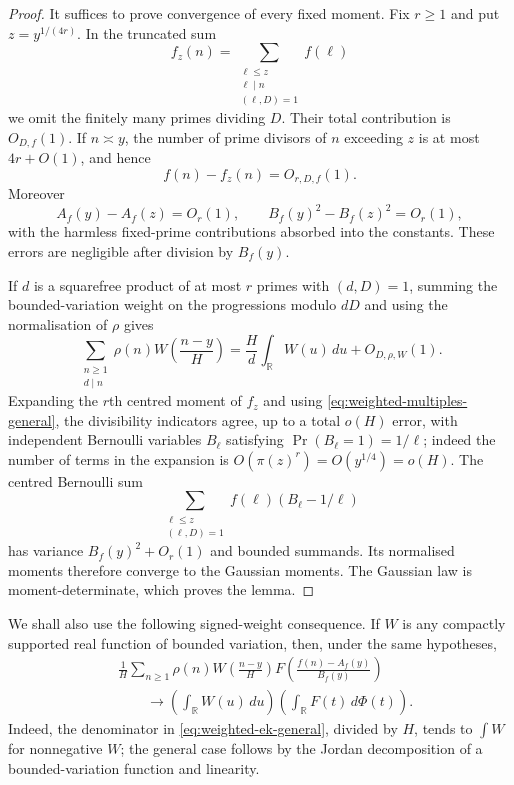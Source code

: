 \documentclass[11pt,reqno]{amsart}
\theoremstyle{plain}
\theoremstyle{definition}
\newcommand{\R}{\mathbb{R}}
\newcommand{\1}{\mathbf 1}
\begin{document}
\begin{proof}
It suffices to prove convergence of every fixed moment.  Fix $r\ge1$ and put $z=y^{1/(4r)}$.  In the truncated sum
\[
 f_z(n)=\sum_{\substack{\ell\le z\\\ell\mid n\\(\ell,D)=1}}f(\ell)
\]
we omit the finitely many primes dividing $D$.  Their total contribution is $O_{D,f}(1)$.  If $n\asymp y$, the number of prime divisors of $n$ exceeding $z$ is at most $4r+O(1)$, and hence
\[
 f(n)-f_z(n)=O_{r,D,f}(1).
\]
Moreover
\[
 A_f(y)-A_f(z)=O_r(1),\qquad B_f(y)^2-B_f(z)^2=O_r(1),
\]
with the harmless fixed-prime contributions absorbed into the constants.  These errors are negligible after division by $B_f(y)$.

If $d$ is a squarefree product of at most $r$ primes with $(d,D)=1$, summing the bounded-variation weight on the progressions modulo $dD$ and using the normalisation of $\rho$ gives
\begin{equation}\label{eq:weighted-multiples-general}
 \sum_{\substack{n\ge1\\d\mid n}}
 \rho(n)W\!\left(\frac{n-y}{H}\right)
 =\frac Hd\int_{\R}W(u)\,du+O_{D,\rho,W}(1).
\end{equation}
Expanding the $r$th centred moment of $f_z$ and using \eqref{eq:weighted-multiples-general}, the divisibility indicators agree, up to a total $o(H)$ error, with independent Bernoulli variables $B_\ell$ satisfying $\Pr(B_\ell=1)=1/\ell$; indeed the number of terms in the expansion is $O(\pi(z)^r)=O(y^{1/4})=o(H)$.  The centred Bernoulli sum
\[
 \sum_{\substack{\ell\le z\\(\ell,D)=1}}f(\ell)(B_\ell-1/\ell)
\]
has variance $B_f(y)^2+O_r(1)$ and bounded summands.  Its normalised moments therefore converge to the Gaussian moments.  The Gaussian law is moment-determinate, which proves the lemma.
\end{proof}

We shall also use the following signed-weight consequence.  If $W$ is any compactly supported real function of bounded variation, then, under the same hypotheses,
\begin{equation}\label{eq:weighted-ek-signed}
\begin{split}
 &\frac1H\sum_{n\ge1}\rho(n)W\!\left(\frac{n-y}{H}\right)
 F\!\left(\frac{f(n)-A_f(y)}{B_f(y)}\right)\\
 &\qquad\longrightarrow
 \left(\int_{\R}W(u)\,du\right)
 \left(\int_{\R}F(t)\,d\Phi(t)\right).
\end{split}
\end{equation}
Indeed, the denominator in \eqref{eq:weighted-ek-general}, divided by $H$, tends to $\int W$ for nonnegative $W$; the general case follows by the Jordan decomposition of a bounded-variation function and linearity.
\end{document}

